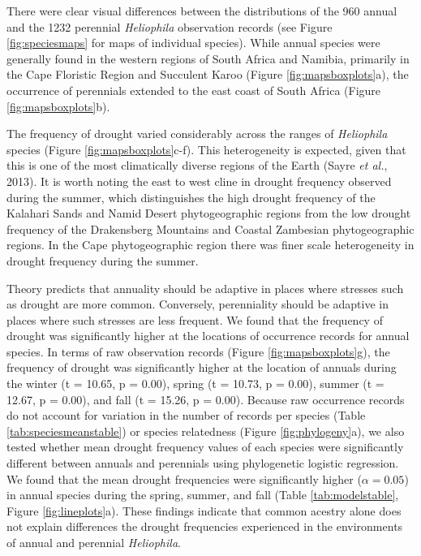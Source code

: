 \documentclass[man,floatsintext]{apa6}
\theoremstyle{definition}
\theoremstyle{definition}
\theoremstyle{definition}
\theoremstyle{remark}
\begin{document}
There were clear visual differences between the distributions of the 960
annual and the 1232 perennial \emph{Heliophila} observation records (see
Figure \ref{fig:speciesmaps} for maps of individual species). While
annual species were generally found in the western regions of South
Africa and Namibia, primarily in the Cape Floristic Region and Succulent
Karoo (Figure \ref{fig:mapsboxplots}a), the occurrence of perennials
extended to the east coast of South Africa (Figure
\ref{fig:mapsboxplots}b).

The frequency of drought varied considerably across the ranges of
\emph{Heliophila} species (Figure \ref{fig:mapsboxplots}c-f). This
heterogeneity is expected, given that this is one of the most
climatically diverse regions of the Earth (Sayre \emph{et al.}, 2013).
It is worth noting the east to west cline in drought frequency observed
during the summer, which distinguishes the high drought frequency of the
Kalahari Sands and Namid Desert phytogeographic regions from the low
drought frequency of the Drakensberg Mountains and Coastal Zambesian
phytogeographic regions. In the Cape phytogeographic region there was
finer scale heterogeneity in drought frequency during the summer.

Theory predicts that annuality should be adaptive in places where
stresses such as drought are more common. Conversely, perenniality
should be adaptive in places where such stresses are less frequent. We
found that the frequency of drought was significantly higher at the
locations of occurrence records for annual species. In terms of raw
observation records (Figure \ref{fig:mapsboxplots}g), the frequency of
drought was significantly higher at the location of annuals during the
winter (t = 10.65, p = 0.00), spring (t = 10.73, p = 0.00), summer (t =
12.67, p = 0.00), and fall (t = 15.26, p = 0.00). Because raw occurrence
records do not account for variation in the number of records per
species (Table \ref{tab:speciesmeanstable}) or species relatedness
(Figure \ref{fig:phylogeny}a), we also tested whether mean drought
frequency values of each species were significantly different between
annuals and perennials using phylogenetic logistic regression. We found
that the mean drought frequencies were significantly higher
(\(\alpha = 0.05\)) in annual species during the spring, summer, and
fall (Table \ref{tab:modelstable}, Figure \ref{fig:lineplots}a). These
findings indicate that common acestry alone does not explain differences
the drought frequencies experienced in the environments of annual and
perennial \emph{Heliophila}.
\end{document}
